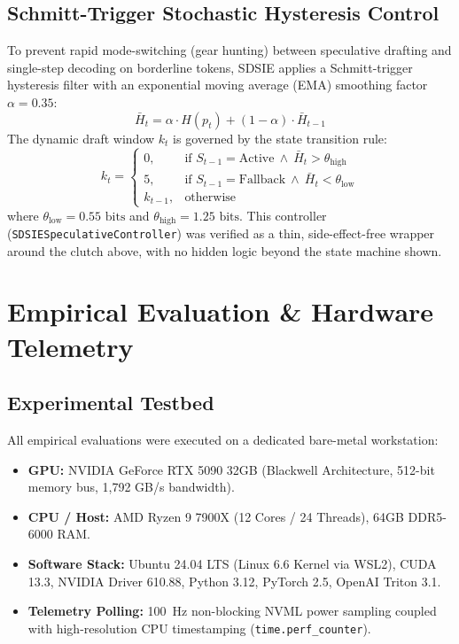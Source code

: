 \documentclass[10pt,journal,compsoc,twocolumn]{IEEEtran}
\begin{document}
\subsection{Schmitt-Trigger Stochastic Hysteresis Control}
To prevent rapid mode-switching (gear hunting) between speculative drafting and single-step decoding on borderline tokens, SDSIE applies a Schmitt-trigger hysteresis filter with an exponential moving average (EMA) smoothing factor $\alpha = 0.35$:
\begin{equation}
\bar{H}_t = \alpha \cdot H(p_t) + (1 - \alpha) \cdot \bar{H}_{t-1}
\end{equation}
The dynamic draft window $k_t$ is governed by the state transition rule:
\begin{equation}
k_t = 
\begin{cases} 
0, & \text{if } S_{t-1} = \text{Active} \ \land \ \bar{H}_t > \theta_{\text{high}} \\
5, & \text{if } S_{t-1} = \text{Fallback} \ \land \ \bar{H}_t < \theta_{\text{low}} \\
k_{t-1}, & \text{otherwise}
\end{cases}
\end{equation}
where $\theta_{\text{low}} = 0.55\text{ bits}$ and $\theta_{\text{high}} = 1.25\text{ bits}$. This controller (\texttt{SDSIESpeculativeController}) was verified as a thin, side-effect-free wrapper around the clutch above, with no hidden logic beyond the state machine shown.

\section{Empirical Evaluation \& Hardware Telemetry}

\subsection{Experimental Testbed}
All empirical evaluations were executed on a dedicated bare-metal workstation:
\begin{itemize}
    \item \textbf{GPU:} NVIDIA GeForce RTX 5090 32GB (Blackwell Architecture, 512-bit memory bus, 1,792 GB/s bandwidth).
    \item \textbf{CPU / Host:} AMD Ryzen 9 7900X (12 Cores / 24 Threads), 64GB DDR5-6000 RAM.
    \item \textbf{Software Stack:} Ubuntu 24.04 LTS (Linux 6.6 Kernel via WSL2), CUDA 13.3, NVIDIA Driver 610.88, Python 3.12, PyTorch 2.5, OpenAI Triton 3.1.
    \item \textbf{Telemetry Polling:} 100~Hz non-blocking NVML power sampling coupled with high-resolution CPU timestamping (\texttt{time.perf\_counter}).
\end{itemize}
\end{document}
